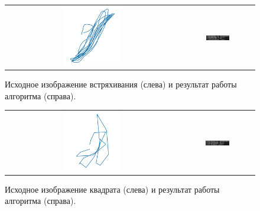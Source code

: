 \begin{figure}[H]
    \begin{center}
        \begin{tabular}{cc}
            \includegraphics[width=0.35\textwidth]{max_kt2_images/image9.jpg} & 
            \includegraphics[width=0.35\textwidth]{max_kt2_images/image8.png} \\
        \end{tabular}
    \end{center}
    \caption{Исходное изображение встряхивания (слева) и результат работы алгоритма (справа).}
\end{figure}

\begin{figure}[H]
    \begin{center}
        \begin{tabular}{cc}
            \includegraphics[width=0.35\textwidth]{max_kt2_images/image3.jpg} & 
            \includegraphics[width=0.35\textwidth]{max_kt2_images/image1.png} \\
        \end{tabular}
    \end{center}
    \caption{Исходное изображение квадрата (слева) и результат работы алгоритма (справа).}
\end{figure}
